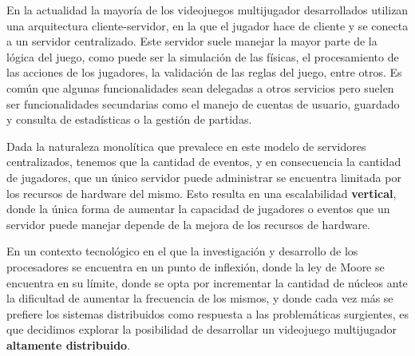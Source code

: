 
\noindent En la actualidad la mayoría de los videojuegos multijugador desarrollados
utilizan una arquitectura cliente-servidor, en la que el jugador
hace de cliente y se conecta a un servidor centralizado. Este servidor suele manejar
la mayor parte de la lógica del juego, como puede ser la simulación de las físicas, el procesamiento
de las acciones de los jugadores, la validación de las reglas del juego, entre otros.
Es común que algunas funcionalidades sean delegadas a otros servicios pero suelen ser funcionalidades
secundarias como el manejo de cuentas de usuario, guardado y consulta de estadísticas
o la gestión de partidas.

Dada la naturaleza monolítica que prevalece en este modelo de servidores centralizados, tenemos que la cantidad de eventos, y en consecuencia la cantidad de jugadores,
que un único servidor puede administrar se encuentra limitada por los recursos de hardware del mismo.
Esto resulta en una escalabilidad \textbf{vertical}, donde la única forma de aumentar la capacidad
de jugadores o eventos que un servidor puede manejar depende de la mejora de los recursos de hardware.

En un contexto tecnológico en el que la investigación y desarrollo de los procesadores
se encuentra en un punto de inflexión, donde la ley de Moore se encuentra en su límite,
donde se opta por incrementar la cantidad de núcleos ante la dificultad de aumentar la frecuencia de los mismos,
y donde cada vez más se prefiere los sistemas distribuidos como respuesta a las problemáticas surgientes,
es que decidimos explorar la posibilidad de desarrollar un videojuego multijugador
\textbf{altamente distribuido}.



